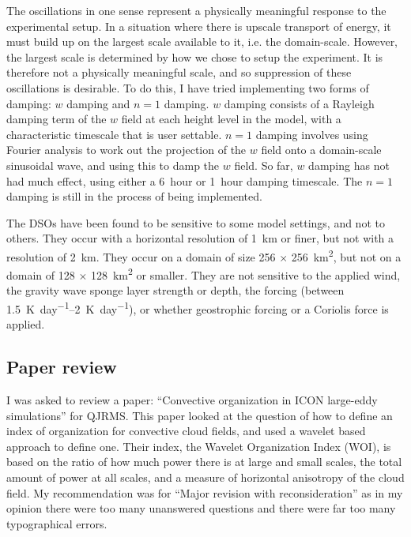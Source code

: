\documentclass[11pt,a4paper]{article}
\newcommand\dom[1]{\si{#1} $\times$ \SI{#1}{km^2}}
\begin{document}
The oscillations in one sense represent a physically meaningful response to the experimental setup. In a situation where there is upscale transport of energy, it must build up on the largest scale available to it, i.e. the domain-scale. However, the largest scale is determined by how we chose to setup the experiment. It is therefore not a physically meaningful scale, and so suppression of these oscillations is desirable. To do this, I have tried implementing two forms of damping: $w$ damping and $n = 1$ damping. $w$ damping consists of a Rayleigh damping term of the $w$ field at each height level in the model, with a characteristic timescale that is user settable. $n = 1$ damping involves using Fourier analysis to work out the projection of the $w$ field onto a domain-scale sinusoidal wave, and using this to damp the $w$ field. So far, $w$ damping has not had much effect, using either a \SI{6}{hour} or \SI{1}{hour} damping timescale. The $n = 1$ damping is still in the process of being implemented.

The DSOs have been found to be sensitive to some model settings, and not to others. They occur with a horizontal resolution of \SI{1}{km} or finer, but not with a resolution of \SI{2}{km}. They occur on a domain of size \dom{256}, but not on a domain of \dom{128} or smaller. They are not sensitive to the applied wind, the gravity wave sponge layer strength or depth, the forcing (between \SIrange{1.5}{2}{K.day^{-1}}), or whether geostrophic forcing or a Coriolis force is applied.

\subsection{Paper review}

I was asked to review a paper: ``Convective organization in ICON large-eddy simulations'' for QJRMS. This paper looked at the question of how to define an index of organization for convective cloud fields, and used a wavelet based approach to define one. Their index, the Wavelet Organization Index (WOI), is based on the ratio of how much power there is at large and small scales, the total amount of power at all scales, and a measure of horizontal anisotropy of the cloud field. 
My recommendation was for ``Major revision with reconsideration'' as in my opinion there were too many unanswered questions and there were far too many typographical errors.
\end{document}

